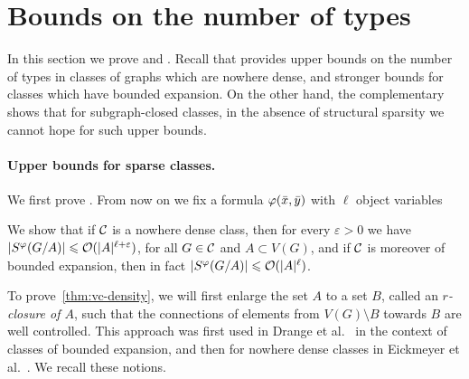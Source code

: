 \section{Bounds on the number of types}\label{sec:types}

In this section we prove  and .
	Recall that  provides upper bounds on the number of types in classes of graphs which are nowhere dense, 
	and stronger bounds for classes which have bounded expansion. 
	On the other hand, the complementary  shows that for subgraph-closed classes, in the absence of structural sparsity we cannot hope for such upper bounds.

\paragraph*{Upper bounds for sparse classes.}
We first prove .
From now on we fix a formula  $\varphi(\bar{x},\bar{y})$
with $\ell$ object variables

We show  that if $\mathcal{C}$ is a nowhere dense class,
then for every $\varepsilon>0$ we have  $|S^\varphi(G/A)|\leqslant \mathcal{O}(|A|^{\ell+\varepsilon})$,
for all $G\in \mathcal{C}$ and $A\subset V(G)$,
 and 
if $\mathcal{C}$ is moreover of bounded expansion, then in fact $|S^\varphi(G/A)|\leqslant \mathcal{O}(|A|^\ell)$.


To prove~\cref{thm:vc-density},
we will first enlarge the set $A$ to a set $B$, called
an \emph{$r$-closure of $A$}, such 
that the connections of elements from $V(G)\setminus B$ 
towards $B$ are well controlled. This approach
was first used in Drange et al.~\cite{drange2016kernelization} in the context of classes of bounded expansion, 
and then for nowhere dense classes in Eickmeyer et al.~\cite{eickmeyer2016neighborhood}. 
We recall these notions.

